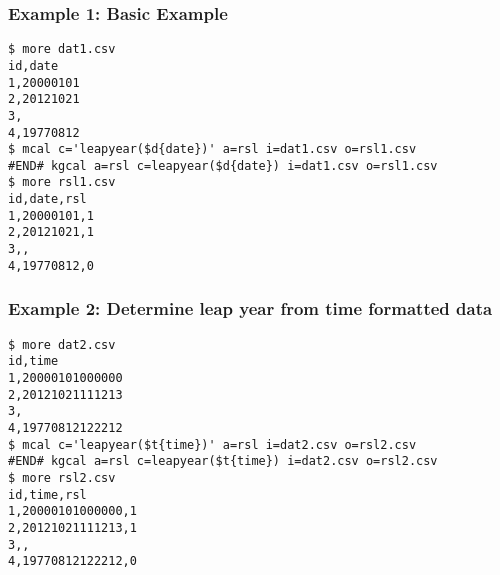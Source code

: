 \subsubsection*{Example 1: Basic Example}



\begin{Verbatim}[baselinestretch=0.7,frame=single]
$ more dat1.csv
id,date
1,20000101
2,20121021
3,
4,19770812
$ mcal c='leapyear($d{date})' a=rsl i=dat1.csv o=rsl1.csv
#END# kgcal a=rsl c=leapyear($d{date}) i=dat1.csv o=rsl1.csv
$ more rsl1.csv
id,date,rsl
1,20000101,1
2,20121021,1
3,,
4,19770812,0
\end{Verbatim}
\subsubsection*{Example 2: Determine leap year from time formatted data}



\begin{Verbatim}[baselinestretch=0.7,frame=single]
$ more dat2.csv
id,time
1,20000101000000
2,20121021111213
3,
4,19770812122212
$ mcal c='leapyear($t{time})' a=rsl i=dat2.csv o=rsl2.csv
#END# kgcal a=rsl c=leapyear($t{time}) i=dat2.csv o=rsl2.csv
$ more rsl2.csv
id,time,rsl
1,20000101000000,1
2,20121021111213,1
3,,
4,19770812122212,0
\end{Verbatim}
